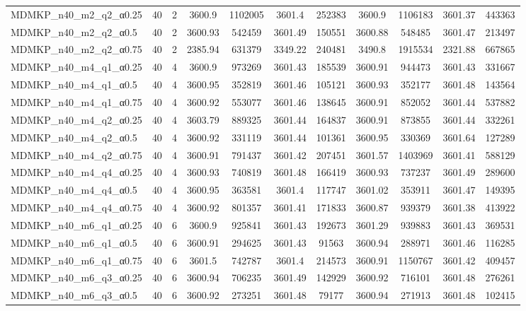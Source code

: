 \begin{table}[!ht]
\begin{tabular}{lcccccccccc}
MDMKP\_n40\_m2\_q2\_α0.25 & 40 & 2 & 3600.9 & 1102005 & 3601.4 & 252383 & 3600.9 & 1106183 & 3601.37 & 443363 \\
MDMKP\_n40\_m2\_q2\_α0.5 & 40 & 2 & 3600.93 & 542459 & 3601.49 & 150551 & 3600.88 & 548485 & 3601.47 & 213497 \\
MDMKP\_n40\_m2\_q2\_α0.75 & 40 & 2 & 2385.94 & 631379 & 3349.22 & 240481 & 3490.8 & 1915534 & 2321.88 & 667865 \\
MDMKP\_n40\_m4\_q1\_α0.25 & 40 & 4 & 3600.9 & 973269 & 3601.43 & 185539 & 3600.91 & 944473 & 3601.43 & 331667 \\
MDMKP\_n40\_m4\_q1\_α0.5 & 40 & 4 & 3600.95 & 352819 & 3601.46 & 105121 & 3600.93 & 352177 & 3601.48 & 143564 \\
MDMKP\_n40\_m4\_q1\_α0.75 & 40 & 4 & 3600.92 & 553077 & 3601.46 & 138645 & 3600.91 & 852052 & 3601.44 & 537882 \\
MDMKP\_n40\_m4\_q2\_α0.25 & 40 & 4 & 3603.79 & 889325 & 3601.44 & 164837 & 3600.91 & 873855 & 3601.44 & 332261 \\
MDMKP\_n40\_m4\_q2\_α0.5 & 40 & 4 & 3600.92 & 331119 & 3601.44 & 101361 & 3600.95 & 330369 & 3601.64 & 127289 \\
MDMKP\_n40\_m4\_q2\_α0.75 & 40 & 4 & 3600.91 & 791437 & 3601.42 & 207451 & 3601.57 & 1403969 & 3601.41 & 588129 \\
MDMKP\_n40\_m4\_q4\_α0.25 & 40 & 4 & 3600.93 & 740819 & 3601.48 & 166419 & 3600.93 & 737237 & 3601.49 & 289600 \\
MDMKP\_n40\_m4\_q4\_α0.5 & 40 & 4 & 3600.95 & 363581 & 3601.4 & 117747 & 3601.02 & 353911 & 3601.47 & 149395 \\
MDMKP\_n40\_m4\_q4\_α0.75 & 40 & 4 & 3600.92 & 801357 & 3601.41 & 171833 & 3600.87 & 939379 & 3601.38 & 413922 \\
MDMKP\_n40\_m6\_q1\_α0.25 & 40 & 6 & 3600.9 & 925841 & 3601.43 & 192673 & 3601.29 & 939883 & 3601.43 & 369531 \\
MDMKP\_n40\_m6\_q1\_α0.5 & 40 & 6 & 3600.91 & 294625 & 3601.43 & 91563 & 3600.94 & 288971 & 3601.46 & 116285 \\
MDMKP\_n40\_m6\_q1\_α0.75 & 40 & 6 & 3601.5 & 742787 & 3601.4 & 214573 & 3600.91 & 1150767 & 3601.42 & 409457 \\
MDMKP\_n40\_m6\_q3\_α0.25 & 40 & 6 & 3600.94 & 706235 & 3601.49 & 142929 & 3600.92 & 716101 & 3601.48 & 276261 \\
MDMKP\_n40\_m6\_q3\_α0.5 & 40 & 6 & 3600.92 & 273251 & 3601.48 & 79177 & 3600.94 & 271913 & 3601.48 & 102415 \\

\end{tabular}
\end{table}
